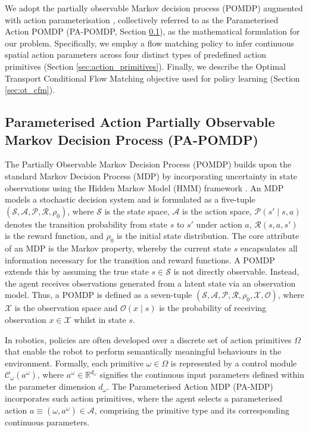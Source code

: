 \documentclass[journal]{IEEEtran}
\begin{document}
We adopt the partially observable Markov decision process (POMDP) \cite{kaelbling1998planning} augmented with action parameterisation \cite{masson2016reinforcement}, collectively referred to as the Parameterised Action POMDP (PA-POMDP, Section \ref{sec:PA-MDP}), as the mathematical formulation for our problem. Specifically, we employ a flow matching policy to infer continuous spatial action parameters across four distinct types of predefined action primitives (Section \ref{sec:action_primitives}). Finally, we describe the Optimal Transport Conditional Flow Matching objective used for policy learning (Section \ref{sec:ot_cfm}).

\subsection{Parameterised Action Partially Observable Markov Decision Process (PA-POMDP)} \label{sec:PA-MDP}

The Partially Observable Markov Decision Process (POMDP) builds upon the standard Markov Decision Process (MDP) \cite{puterman2014markov} by incorporating uncertainty in state observations using the Hidden Markov Model (HMM) framework \cite{rabiner2002tutorial}. An MDP models a stochastic decision system and is formulated as a five-tuple $(\mathcal{S}, \mathcal{A}, \mathcal{P}, \mathcal{R}, \rho_0)$, where $\mathcal{S}$ is the state space, $\mathcal{A}$ is the action space, $\mathcal{P}(s' \mid s, a)$ denotes the transition probability from state $s$ to $s'$ under action $a$, $\mathcal{R}(s, a, s')$ is the reward function, and $\rho_0$ is the initial state distribution. The core attribute of an MDP is the Markov property, whereby the current state $s$ encapsulates all information necessary for the transition and reward functions. A POMDP extends this by assuming the true state $s \in \mathcal{S}$ is not directly observable. Instead, the agent receives observations generated from a latent state via an observation model. Thus, a POMDP is defined as a seven-tuple $(\mathcal{S}, \mathcal{A}, \mathcal{P}, \mathcal{R}, \rho_0, \mathcal{X}, \mathcal{O})$, where $\mathcal{X}$ is the observation space and $\mathcal{O}(x \mid s)$ is the probability of receiving observation $x \in \mathcal{X}$ whilst in state $s$.

In robotics, policies are often developed over a discrete set of action primitives $\Omega$ that enable the robot to perform semantically meaningful behaviours in the environment. Formally, each primitive $\omega \in \Omega$ is represented by a control module $\mathcal{C}_\omega(a^{\omega})$, where $a^{\omega} \in \mathbb{R}^{d_{\omega}}$ signifies the continuous input parameters defined within the parameter dimension $d_{\omega}$. The Parameterised Action MDP (PA-MDP) \cite{masson2016reinforcement} incorporates such action primitives, where the agent selects a parameterised action $a \equiv (\omega, a^{\omega}) \in \mathcal{A}$, comprising the primitive type and its corresponding continuous parameters.
\end{document}
